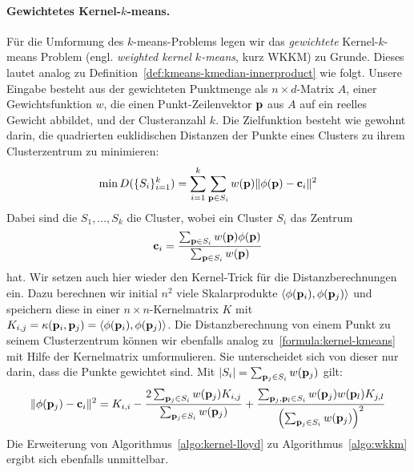 \paragraph{Gewichtetes Kernel-$k$-means.} Für die Umformung des $k$-means-Problems legen wir das \emph{gewichtete}
Kernel-$k$-means Problem (engl. \emph{weighted kernel $k$-means}, kurz WKKM) zu Grunde.
Dieses lautet analog zu Definition~\ref{def:kmeans-kmedian-innerproduct} wie folgt.
Unsere Eingabe besteht aus der gewichteten Punktmenge
als $n \times d$-Matrix $A$, einer Gewichtsfunktion $w$, die einen Punkt-Zeilenvektor $\mathbf{p}$ aus $A$ auf ein reelles Gewicht
abbildet, und der Clusteranzahl $k$. Die Zielfunktion besteht wie gewohnt darin, die quadrierten euklidischen Distanzen der
Punkte eines Clusters zu ihrem Clusterzentrum zu minimieren:
\begin{align}
\label{formula:wkkm-objective}
	\min D(\{S_i\}_{i=1}^{k}) = \sum_{i=1}^{k} \sum_{\mathbf{p} \in S_i} w(\mathbf{p}) \lVert {\phi(\ensuremath{\mathbf{p}})} - {\mathbf{c}_i} \rVert^2
\end{align}
Dabei sind die $S_1, \dots, S_k$ die Cluster, wobei ein Cluster $S_i$ das Zentrum
\[ \mathbf{c}_i = \frac{\sum_{\mathbf{p} \in S_i} w(\mathbf{p}) \phi(\mathbf{p})}{\sum_{\mathbf{p} \in S_i} w(\mathbf{p})} \]
hat. Wir setzen auch hier wieder den Kernel-Trick für die Distanzberechnungen ein. Dazu berechnen wir initial $n^2$ viele
Skalarprodukte $\langle \phi(\mathbf{p}_i), \phi(\mathbf{p}_j) \rangle$ und speichern diese in einer
$n \times n$-Kernelmatrix $K$ mit $K_{i,j} = \kappa(\mathbf{p}_i, \mathbf{p}_j) = \langle \phi(\mathbf{p}_i), \phi(\mathbf{p}_j) \rangle$.
Die Distanzberechnung von einem Punkt zu seinem Clusterzentrum
können wir ebenfalls analog zu~\ref{formula:kernel-kmeans} mit Hilfe der Kernelmatrix umformulieren. Sie unterscheidet sich von
dieser nur darin, dass die Punkte gewichtet sind. Mit $\left| S_i \right| = \sum_{\mathbf{p}_j \in S_i} w(\mathbf{p}_j)$ gilt:
\begin{align}
\label{formula:wkkm}
	\lVert {\phi(\ensuremath{\mathbf{p}}_j)} - {\mathbf{c}_i} \rVert^2 =
	K_{i,i} - \frac{2 \sum_{\mathbf{p}_j \in S_i} w(\mathbf{p}_j) K_{i,j}}{\sum_{\mathbf{p}_j \in S_i} w(\mathbf{p}_j)}
	+ \frac{\sum_{\mathbf{p}_j, \mathbf{p}_l \in S_i} w(\mathbf{p}_j) w(\mathbf{p}_l) K_{j,l}}{\left(\sum_{\mathbf{p}_j \in S_i} w(\mathbf{p}_j)\right)^2}
\end{align}
Die Erweiterung von Algorithmus~\ref{algo:kernel-lloyd} zu Algorithmus~\ref{algo:wkkm} ergibt sich ebenfalls unmittelbar.
